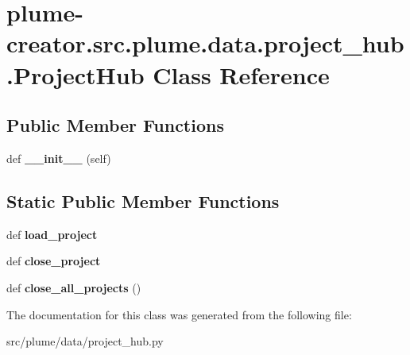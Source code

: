 \hypertarget{classplume-creator_1_1src_1_1plume_1_1data_1_1project__hub_1_1_project_hub}{}\section{plume-\/creator.src.\+plume.\+data.\+project\+\_\+hub.\+Project\+Hub Class Reference}
\label{classplume-creator_1_1src_1_1plume_1_1data_1_1project__hub_1_1_project_hub}
\subsection*{Public Member Functions}
\begin{DoxyCompactItemize}
\item 
def {\bfseries \+\_\+\+\_\+init\+\_\+\+\_\+} (self)\hypertarget{classplume-creator_1_1src_1_1plume_1_1data_1_1project__hub_1_1_project_hub_ad4d67dbc0bea006462a2f4674aa91adf}{}\label{classplume-creator_1_1src_1_1plume_1_1data_1_1project__hub_1_1_project_hub_ad4d67dbc0bea006462a2f4674aa91adf}

\end{DoxyCompactItemize}
\subsection*{Static Public Member Functions}
\begin{DoxyCompactItemize}
\item 
def {\bfseries load\+\_\+project}\hypertarget{classplume-creator_1_1src_1_1plume_1_1data_1_1project__hub_1_1_project_hub_a77d8c9f92222a00d4053e5c1700bbf77}{}\label{classplume-creator_1_1src_1_1plume_1_1data_1_1project__hub_1_1_project_hub_a77d8c9f92222a00d4053e5c1700bbf77}

\item 
def {\bfseries close\+\_\+project}\hypertarget{classplume-creator_1_1src_1_1plume_1_1data_1_1project__hub_1_1_project_hub_afb012c84de1aad76b9795c9b87542faf}{}\label{classplume-creator_1_1src_1_1plume_1_1data_1_1project__hub_1_1_project_hub_afb012c84de1aad76b9795c9b87542faf}

\item 
def {\bfseries close\+\_\+all\+\_\+projects} ()\hypertarget{classplume-creator_1_1src_1_1plume_1_1data_1_1project__hub_1_1_project_hub_aae06895b7dc932dc50d702deaf4b81f5}{}\label{classplume-creator_1_1src_1_1plume_1_1data_1_1project__hub_1_1_project_hub_aae06895b7dc932dc50d702deaf4b81f5}

\end{DoxyCompactItemize}


The documentation for this class was generated from the following file\+:\begin{DoxyCompactItemize}
\item 
src/plume/data/project\+\_\+hub.\+py\end{DoxyCompactItemize}
